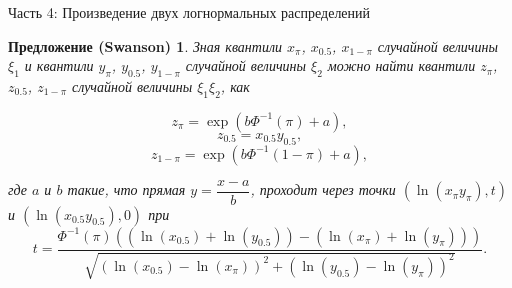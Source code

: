 \documentclass[ucs, notheorems, handout]{beamer}
\newtheorem{proposition}[theorem]{Предложение (Swanson)}
\begin{document}
	\begin{frame}{Часть 4: Произведение двух логнормальных распределений}
		
		\begin{proposition}
			Зная квантили $x_{\pi}$, $x_{0.5}$, $x_{1-\pi}$ случайной величины $\xi_{1}$ и квантили $y_{\pi}$, $y_{0.5}$, $y_{1-\pi}$ случайной величины $\xi_{2}$ можно найти квантили $z_{\pi}$, $z_{0.5}$, $z_{1-\pi}$ случайной величины $\xi_{1}\xi_{2}$, как
			
			\begin{equation*}
				z_{\pi}=\exp(b\Phi^{-1}(\pi)+a),
			\end{equation*}
			\begin{equation*}
				z_{0.5}=x_{0.5}y_{0.5},
			\end{equation*}
			\begin{equation*}
				z_{1-\pi}=\exp(b\Phi^{-1}(1-\pi)+a),
			\end{equation*}
			
			где $a$ и $b$ такие, что прямая $y=\dfrac{x-a}{b}$, проходит через точки $(\ln(x_{\pi}y_{\pi}), t)$ и $(\ln(x_{0.5}y_{0.5}),0)$ при
			\begin{equation*}
				t = \frac{\Phi^{-1}(\pi)((\ln(x_{0.5})+\ln(y_{0.5}))-(\ln(x_{\pi})+\ln(y_{\pi})))}{\sqrt{(\ln(x_{0.5})-\ln(x_{\pi}))^{2}+(\ln(y_{0.5})-\ln(y_{\pi}))^{2}}}. 
			\end{equation*}
		\end{proposition}
	
	
	\end{frame}
	
\end{document}
